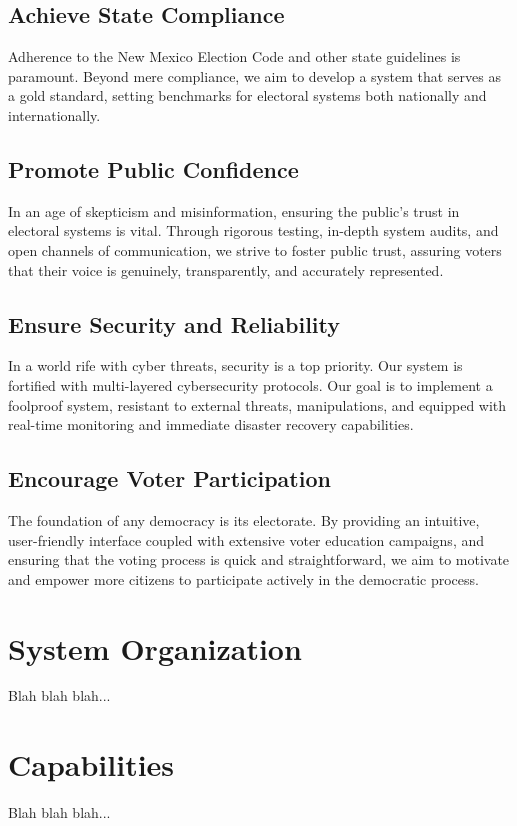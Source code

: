 \documentclass{article}
\begin{document}
\subsection{Achieve State Compliance}
Adherence to the New Mexico Election Code and other state guidelines is paramount. Beyond mere compliance, we aim to develop a system that serves as a gold standard, setting benchmarks for electoral systems both nationally and internationally.

\subsection{Promote Public Confidence}
In an age of skepticism and misinformation, ensuring the public's trust in electoral systems is vital. Through rigorous testing, in-depth system audits, and open channels of communication, we strive to foster public trust, assuring voters that their voice is genuinely, transparently, and accurately represented.

\subsection{Ensure Security and Reliability}
In a world rife with cyber threats, security is a top priority. Our system is fortified with multi-layered cybersecurity protocols. Our goal is to implement a foolproof system, resistant to external threats, manipulations, and equipped with real-time monitoring and immediate disaster recovery capabilities.

\subsection{Encourage Voter Participation}
The foundation of any democracy is its electorate. By providing an intuitive, user-friendly interface coupled with extensive voter education campaigns, and ensuring that the voting process is quick and straightforward, we aim to motivate and empower more citizens to participate actively in the democratic process.

\section{System Organization}
Blah blah blah...

\section{Capabilities}
Blah blah blah...
\end{document}
